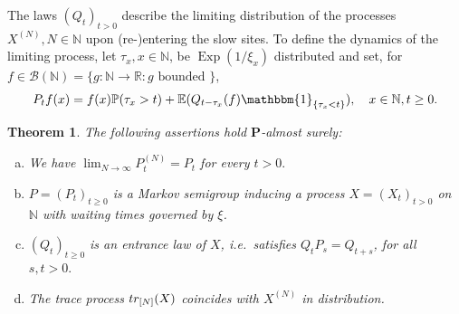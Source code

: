 \documentclass[11pt,a4paper]{scrartcl}
\numberwithin{equation}{section}
\theoremstyle{plain}
\newtheorem{theorem}{Theorem}[section]
\theoremstyle{definition}
\theoremstyle{remark}
\newcommand{\bE}{\ensuremath{\mathbb{E}}}
\newcommand{\bN}{\ensuremath{\mathbb{N}}}
\newcommand{\bP}{\ensuremath{\mathbb{P}}}
\newcommand{\bR}{\ensuremath{\mathbb{R}}}
\newcommand{\ind}{\ensuremath{\mathbbm{1}}}
\newcommand{\bfP}{\mathbf{P}}
\begin{document}
The laws $(Q_t)_{t>0}$ describe the limiting distribution of the processes $X^{(N)}, N\in\bN$ upon (re-)entering the slow sites. To define the dynamics of the limiting process, let $\tau_x, x\in\bN$, be $\operatorname{Exp}(1/\xi_x)$ distributed and set, for $f\in\mathcal{B}(\bN)=\{g:\bN \to \bR: g \text{ bounded }\}$,
\begin{align}\label{eq:P_t-decomposition}
	P_tf(x) = f(x)\bP(\tau_x>t) + \bE(Q_{t-\tau_x}(f)\ind_{\{\tau_x<t\}}),\quad x\in\bN, t\geq 0.
\end{align}
\begin{theorem}\label{thm:OSTRW}
The following assertions hold $\bfP$-almost surely:
\begin{enumerate}[(a)]
	\item We have $\lim_{N\to\infty}P_t^{(N)}=P_t$ for every $t>0.$
	\item $P=(P_t)_{t\geq 0}$ is a Markov semigroup inducing a process $X=(X_t)_{t> 0}$ on $\bN$ with waiting times governed by $\xi$.
	\item $(Q_t)_{t\geq0}$ is an entrance law of $X$, i.e.\ satisfies $Q_t P_s = Q_{t+s}$, for all $s,t>0.$
	\item The trace process $\textup{tr}_{[N]}(X)$ coincides with $X^{(N)}$ in distribution.
\end{enumerate}	
\end{theorem}
\end{document}
